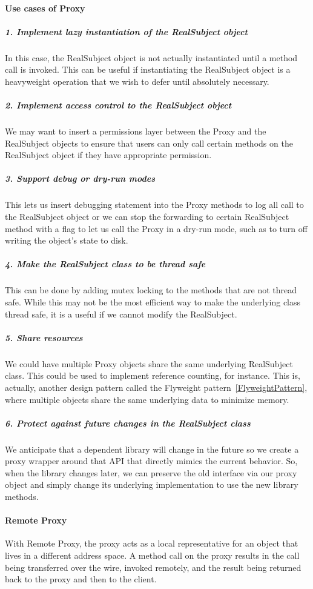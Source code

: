 \documentclass{book}
\begin{document}
\paragraph{Use cases of Proxy}
\subparagraph{1. Implement lazy instantiation of the RealSubject object}
    In this case, the RealSubject object is not actually instantiated until a method call is invoked.
    This can be useful if instantiating the RealSubject object is a heavyweight operation that we wish to defer until absolutely necessary.
 \subparagraph{2. Implement access control to the RealSubject object}
    We may want to insert a permissions layer between the Proxy and the RealSubject objects 
    to ensure that users can only call certain methods on the RealSubject object if they have appropriate permission.
 \subparagraph{3. Support debug or dry-run modes}
    This lets us insert debugging statement into the Proxy methods to log all call to the RealSubject object or
    we can stop the forwarding to certain RealSubject method with a flag to let us call the Proxy in a dry-run mode, such as to turn off writing the object's state to disk.
 \subparagraph{4. Make the RealSubject class to be thread safe}
    This can be done by adding mutex locking to the methods that are not thread safe.
    While this may not be the most efficient way to make the underlying class thread safe, it is a useful if we cannot modify the RealSubject.
 \subparagraph{5. Share resources}
    We could have multiple Proxy objects share the same underlying RealSubject class. This could be used to implement reference counting, for instance.
    This is, actually, another design pattern called the Flyweight pattern~\ref{FlyweightPattern}, where multiple objects share the same underlying data to minimize memory.
 \subparagraph{6. Protect against future changes in the RealSubject class}
    We anticipate that a dependent library will change in the future so we create a proxy wrapper around that API that directly mimics the current behavior.
    So, when the library changes later, we can preserve the old interface via our proxy object and simply change its underlying implementation to use the new library methods.

\paragraph{Remote Proxy}
With Remote Proxy, the proxy acts as a local representative for an object that lives in a different address space.
A method call on the proxy results in the call being transferred over the wire, invoked remotely, and the result being returned back to the proxy and then to the client.
\end{document}
